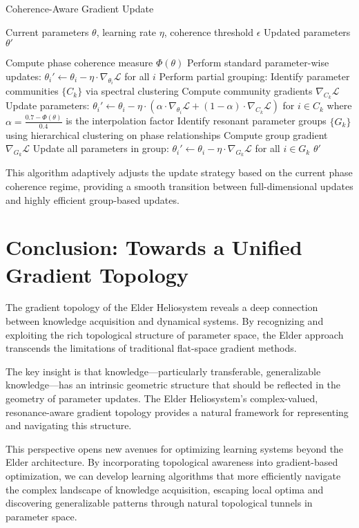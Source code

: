 \begin{algorithm}
\caption{Coherence-Aware Gradient Update}
\begin{algorithmic}[1]
\Require Current parameters $\theta$, learning rate $\eta$, coherence threshold $\epsilon$
\Ensure Updated parameters $\theta'$

\State Compute phase coherence measure $\Phi(\theta)$
    \State Perform standard parameter-wise updates: $\theta_i' \leftarrow \theta_i - \eta \cdot \nabla_{\theta_i} \mathcal{L}$ for all $i$
    \State Perform partial grouping: Identify parameter communities $\{C_k\}$ via spectral clustering
    \State Compute community gradients $\nabla_{C_k} \mathcal{L}$ 
    \State Update parameters: $\theta_i' \leftarrow \theta_i - \eta \cdot (\alpha \cdot \nabla_{\theta_i} \mathcal{L} + (1-\alpha) \cdot \nabla_{C_k} \mathcal{L})$ for $i \in C_k$
    \State where $\alpha = \frac{0.7 - \Phi(\theta)}{0.4}$ is the interpolation factor
\Else
    \State Identify resonant parameter groups $\{G_k\}$ using hierarchical clustering on phase relationships
        \State Compute group gradient $\nabla_{G_k} \mathcal{L}$
        \State Update all parameters in group: $\theta_i' \leftarrow \theta_i - \eta \cdot \nabla_{G_k} \mathcal{L}$ for all $i \in G_k$
    \EndFor
\EndIf
\State \Return $\theta'$
\end{algorithmic}
\end{algorithm}

This algorithm adaptively adjusts the update strategy based on the current phase coherence regime, providing a smooth transition between full-dimensional updates and highly efficient group-based updates.

\section{Conclusion: Towards a Unified Gradient Topology}

The gradient topology of the Elder Heliosystem reveals a deep connection between knowledge acquisition and dynamical systems. By recognizing and exploiting the rich topological structure of parameter space, the Elder approach transcends the limitations of traditional flat-space gradient methods.

The key insight is that knowledge—particularly transferable, generalizable knowledge—has an intrinsic geometric structure that should be reflected in the geometry of parameter updates. The Elder Heliosystem's complex-valued, resonance-aware gradient topology provides a natural framework for representing and navigating this structure.

This perspective opens new avenues for optimizing learning systems beyond the Elder architecture. By incorporating topological awareness into gradient-based optimization, we can develop learning algorithms that more efficiently navigate the complex landscape of knowledge acquisition, escaping local optima and discovering generalizable patterns through natural topological tunnels in parameter space.